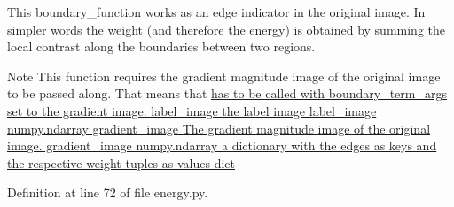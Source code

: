 This boundary\_\-function works as an edge indicator in the original image. In simpler words the weight (and therefore the energy) is obtained by summing the local contrast along the boundaries between two regions.

\begin{DoxyNote}{Note}
This function requires the gradient magnitude image of the original image to be passed along. That means that \hyperlink{}{has to be called with boundary\_\-term\_\-args set to the gradient image.   label\_\-image the label image  label\_\-image numpy.ndarray  gradient\_\-image The gradient magnitude image of the original image.  gradient\_\-image numpy.ndarray   a dictionary with the edges as keys and the respective weight tuples as values  dict }
\end{DoxyNote}


Definition at line 72 of file energy.py.

